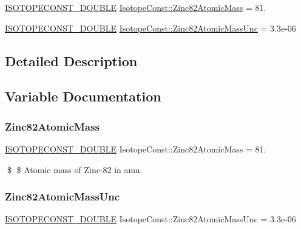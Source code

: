 \begin{DoxyCompactItemize}
\item 
\mbox{\hyperlink{group___isotope_const-_macros_ga8f45a7272ce02c0b4c65c44636ed719a}{I\+S\+O\+T\+O\+P\+E\+C\+O\+N\+S\+T\+\_\+\+D\+O\+U\+B\+LE}} \mbox{\hyperlink{group___isotope_const-_zinc-_zn82_gad2dd5d576d800a7bf8af99844a37fe1c}{Isotope\+Const\+::\+Zinc82\+Atomic\+Mass}} = 81.
\item 
\mbox{\hyperlink{group___isotope_const-_macros_ga8f45a7272ce02c0b4c65c44636ed719a}{I\+S\+O\+T\+O\+P\+E\+C\+O\+N\+S\+T\+\_\+\+D\+O\+U\+B\+LE}} \mbox{\hyperlink{group___isotope_const-_zinc-_zn82_ga10faf2815fec52430bab1b9bcf0fc3c2}{Isotope\+Const\+::\+Zinc82\+Atomic\+Mass\+Unc}} = 3.\+3e-\/06
\end{DoxyCompactItemize}


\subsection{Detailed Description}


\subsection{Variable Documentation}
\mbox{\label{group___isotope_const-_zinc-_zn82_gad2dd5d576d800a7bf8af99844a37fe1c}} 
\subsubsection{\texorpdfstring{Zinc82\+Atomic\+Mass}{Zinc82AtomicMass}}
{\footnotesize\ttfamily \mbox{\hyperlink{group___isotope_const-_macros_ga8f45a7272ce02c0b4c65c44636ed719a}{I\+S\+O\+T\+O\+P\+E\+C\+O\+N\+S\+T\+\_\+\+D\+O\+U\+B\+LE}} Isotope\+Const\+::\+Zinc82\+Atomic\+Mass = 81.}

\$ \$ Atomic mass of Zinc-\/82 in amu. \mbox{\label{group___isotope_const-_zinc-_zn82_ga10faf2815fec52430bab1b9bcf0fc3c2}} 
\subsubsection{\texorpdfstring{Zinc82\+Atomic\+Mass\+Unc}{Zinc82AtomicMassUnc}}
{\footnotesize\ttfamily \mbox{\hyperlink{group___isotope_const-_macros_ga8f45a7272ce02c0b4c65c44636ed719a}{I\+S\+O\+T\+O\+P\+E\+C\+O\+N\+S\+T\+\_\+\+D\+O\+U\+B\+LE}} Isotope\+Const\+::\+Zinc82\+Atomic\+Mass\+Unc = 3.\+3e-\/06}

